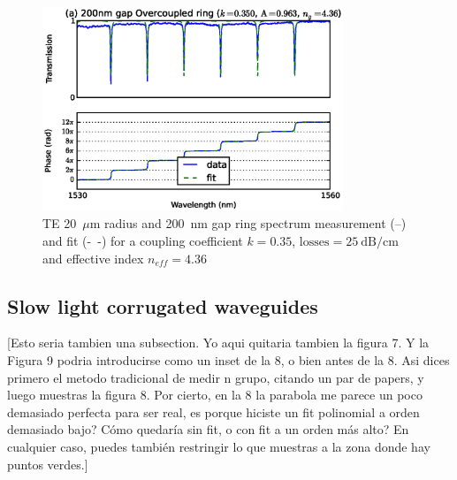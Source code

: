 \documentclass[journal]{IEEEtran}
\begin{document}
\begin{figure}[htb]
\centerline{\includegraphics[width=9cm]{r20g200TE_fitPhaseAmp}}
\caption{TE 20~$\mu$m radius and 200~nm gap ring spectrum measurement (--) and fit (-~-) for a coupling coefficient $k=0.35$, $\mathrm{losses=25~dB/cm}$ and effective index $n_{eff}=4.36$}
\label{fig:overcoupled}
\end{figure}



\subsection{Slow light corrugated waveguides}

[Esto seria tambien una subsection. Yo aqui quitaria tambien la figura 7. Y la Figura 9 podria introducirse como un inset de la 8, o bien antes de la 8. Asi dices primero el metodo tradicional de medir n grupo, citando un par de papers, y luego muestras la figura 8.
Por cierto, en la 8 la parabola me parece un poco demasiado perfecta para ser real, es porque hiciste un fit polinomial a orden demasiado bajo? Cómo quedaría sin fit, o con fit a un orden más alto? En cualquier caso, puedes también restringir lo que muestras a la zona donde hay puntos verdes.]

% 
\end{document}
